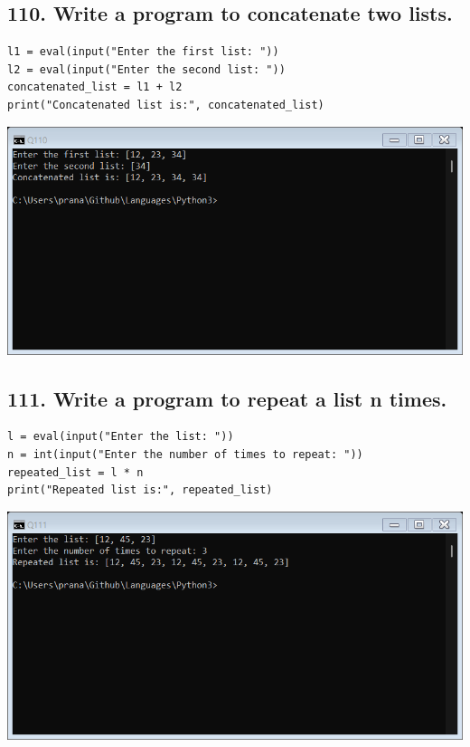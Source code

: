 \documentclass[12pt]{article}
\begin{document}
\subsection*{110. Write a program to concatenate two lists.}
\begin{verbatim}
l1 = eval(input("Enter the first list: "))
l2 = eval(input("Enter the second list: "))
concatenated_list = l1 + l2
print("Concatenated list is:", concatenated_list)
\end{verbatim}
\includegraphics[width=\linewidth]{images/110.png}

\subsection*{111. Write a program to repeat a list n times.}
\begin{verbatim}
l = eval(input("Enter the list: "))
n = int(input("Enter the number of times to repeat: "))
repeated_list = l * n
print("Repeated list is:", repeated_list)
\end{verbatim}
\includegraphics[width=\linewidth]{images/111.png}
\end{document}

